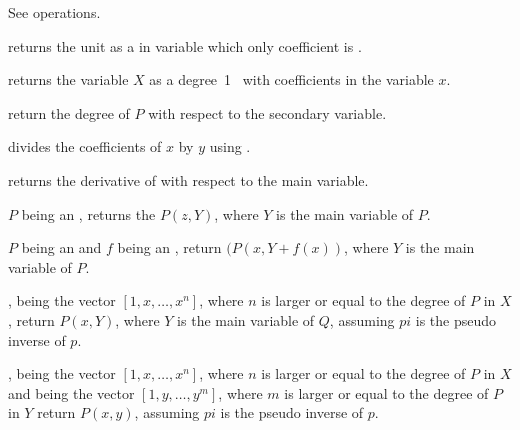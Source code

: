  See  operations.

 returns the unit  as a
 in variable  which only coefficient is .

 returns the variable $X$ as a
degree~1~ with  coefficients in the variable $x$.

 return the degree of $P$ with respect to
the secondary variable.










 divides the coefficients of $x$
by $y$ using .

 returns the derivative of  with
respect to the main variable.

 $P$ being an , returns
the  $P(z,Y)$, where $Y$ is the main variable of $P$.

 $P$ being an  and $f$
being an , return $(P(x,Y+f(x))$, where $Y$ is the main variable of $P$.

, 
being the vector $[1,x,\dots,x^n]$, where $n$ is larger or equal to the degree
of $P$ in $X$, return $P(x,Y)$, where $Y$ is the main variable of $Q$, assuming
$pi$ is the pseudo inverse of $p$.

,
 being the vector $[1,x,\dots,x^n]$, where $n$ is larger or equal to the degree
of $P$ in $X$ and  being the vector $[1,y,\dots,y^m]$, where $m$ is larger or equal to the degree of $P$ in $Y$ return $P(x,y)$, assuming
$pi$ is the pseudo inverse of $p$.

